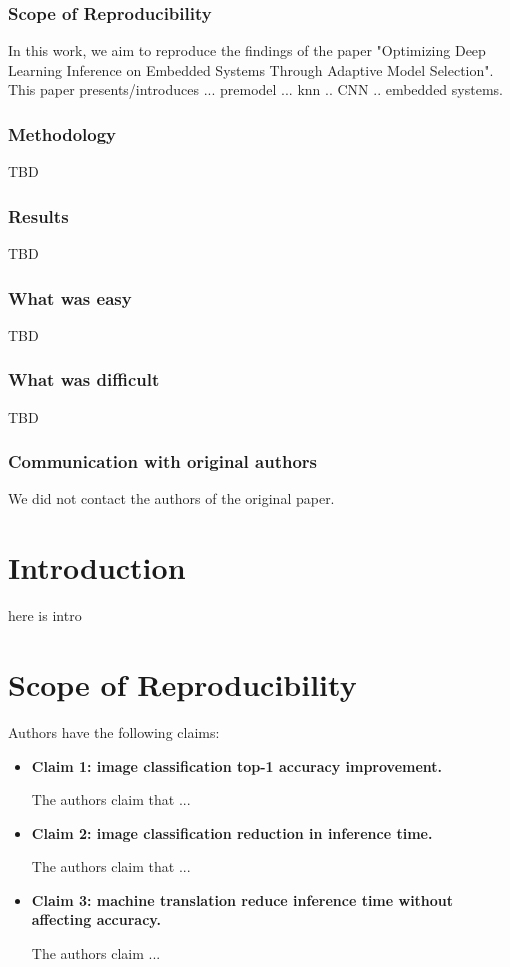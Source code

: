 \subsubsection{Scope of Reproducibility}
 In this work, we aim to reproduce the findings of the paper "Optimizing Deep Learning Inference on Embedded Systems Through Adaptive Model Selection"\supercite{marco2019optimizing}. This paper presents/introduces ... premodel ... knn .. CNN .. embedded systems.

\subsubsection{Methodology}
TBD

\subsubsection{Results}
TBD

\subsubsection{What was easy}
TBD

\subsubsection{What was difficult}
TBD

\subsubsection{Communication with original authors}
We did not contact the authors of the original paper.



\section{Introduction}
here is intro

\section{Scope of Reproducibility}
Authors have the following claims:
\begin{itemize}
    \item \textbf{Claim 1: image classification top-1 accuracy improvement.} 
    
    The authors claim that ...
    
    \item \textbf{Claim 2: image classification reduction in inference time.}

    The authors claim that ...
    
    \item \textbf{Claim 3: machine translation reduce inference time without affecting accuracy.} 

    The authors claim ...
    
\end{itemize}


